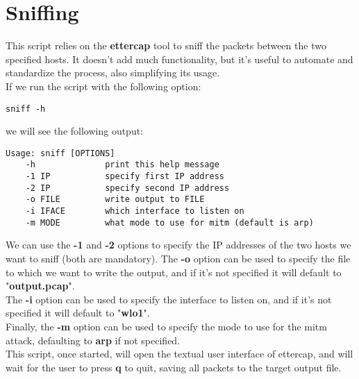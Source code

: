 \section{Sniffing}
This script relies on the \textbf{ettercap}\cite{ettercap-home}\cite{ettercap-kali}\cite{ettercap-man} tool to sniff the packets between the two specified
hosts. It doesn't add much functionality, but it's useful to automate
and standardize the process, also simplifying its usage.\\
If we run the script with the following option:
\begin{lstlisting}[numbers=none]
    sniff -h
\end{lstlisting}
we will see the following output:
\begin{lstlisting}[numbers=none]
    Usage: sniff [OPTIONS]
    -h              print this help message
    -1 IP           specify first IP address
    -2 IP           specify second IP address
    -o FILE         write output to FILE
    -i IFACE        which interface to listen on
    -m MODE         what mode to use for mitm (default is arp)
\end{lstlisting}
We can use the \textbf{-1} and \textbf{-2} options to specify the IP addresses of the
two hosts we want to sniff (both are mandatory). The \textbf{-o} option can be used
to specify the file to which we want to write the output, and if it's not specified
it will default to "\textbf{output.pcap}".\\
The \textbf{-i} option can be used to specify the interface to listen on, and if it's
not specified it will default to "\textbf{wlo1}".\\
Finally, the \textbf{-m} option can be used to specify the mode to use for the mitm
attack, defaulting to \textbf{arp} if not specified.\\
This script, once started, will open the textual user interface of ettercap,
and will wait for the user to press \textbf{q} to quit, saving all packets
to the target output file.\\
\newpage